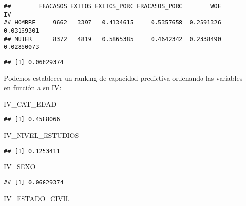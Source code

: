 \documentclass[]{article}
\newenvironment{Shaded}{\begin{snugshade}}{\end{snugshade}}
\newcommand{\KeywordTok}[1]{\textcolor[rgb]{0.13,0.29,0.53}{\textbf{#1}}}
\newcommand{\OperatorTok}[1]{\textcolor[rgb]{0.81,0.36,0.00}{\textbf{#1}}}
\newcommand{\NormalTok}[1]{#1}
\begin{document}
\begin{verbatim}
##        FRACASOS EXITOS EXITOS_PORC FRACASOS_PORC        WOE         IV
## HOMBRE     9662   3397   0.4134615     0.5357658 -0.2591326 0.03169301
## MUJER      8372   4819   0.5865385     0.4642342  0.2338490 0.02860073
\end{verbatim}

\begin{Shaded}
\end{Shaded}

\begin{verbatim}
## [1] 0.06029374
\end{verbatim}

Podemos establecer un ranking de capacidad predictiva ordenando las
variables en función a su IV:

\begin{Shaded}
\begin{Highlighting}[]
\NormalTok{IV_CAT_EDAD}
\end{Highlighting}
\end{Shaded}

\begin{verbatim}
## [1] 0.4588066
\end{verbatim}

\begin{Shaded}
\begin{Highlighting}[]
\NormalTok{IV_NIVEL_ESTUDIOS}
\end{Highlighting}
\end{Shaded}

\begin{verbatim}
## [1] 0.1253411
\end{verbatim}

\begin{Shaded}
\begin{Highlighting}[]
\NormalTok{IV_SEXO}
\end{Highlighting}
\end{Shaded}

\begin{verbatim}
## [1] 0.06029374
\end{verbatim}

\begin{Shaded}
\begin{Highlighting}[]
\NormalTok{IV_ESTADO_CIVIL}
\end{Highlighting}
\end{Shaded}
\end{document}
